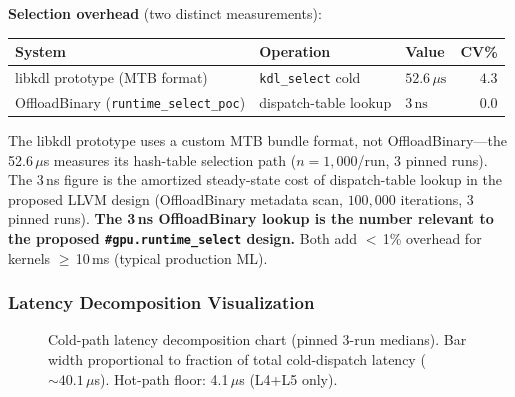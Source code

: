 \documentclass[10pt]{article}
\begin{document}
\textbf{Selection overhead} (two distinct measurements):

\begin{center}
\footnotesize
\begin{tabular}{lllr}
  \toprule
  System & Operation & Value & CV\% \\
  \midrule
  libkdl prototype (MTB format) & \texttt{kdl\_select} cold & $52.6\,\mu\text{s}$ & $4.3$ \\
  OffloadBinary (\texttt{runtime\_select\_poc}) & dispatch-table lookup & $3\,\text{ns}$ & $0.0$ \\
  \bottomrule
\end{tabular}
\normalsize
\end{center}

{\footnotesize The libkdl prototype uses a custom MTB bundle format, not OffloadBinary---the 52.6\,$\mu$s measures its hash-table selection path ($n{=}1{,}000$/run, 3 pinned runs).
The 3\,ns figure is the amortized steady-state cost of dispatch-table lookup in the proposed LLVM design (OffloadBinary metadata scan, $100{,}000$ iterations, 3 pinned runs).
\textbf{The 3\,ns OffloadBinary lookup is the number relevant to the proposed \texttt{\#gpu.runtime\_select} design.}
Both add $<$\,1\% overhead for kernels $\geq$\,10\,ms (typical production ML).}

\subsubsection{Latency Decomposition Visualization}

\begin{figure}[H]
  \centering
  \caption{Cold-path latency decomposition chart (pinned 3-run medians). Bar width proportional to fraction of total cold-dispatch latency (${\sim}40.1\,\mu$s). Hot-path floor: 4.1\,$\mu$s (L4+L5 only).}
\end{figure}
\end{document}
